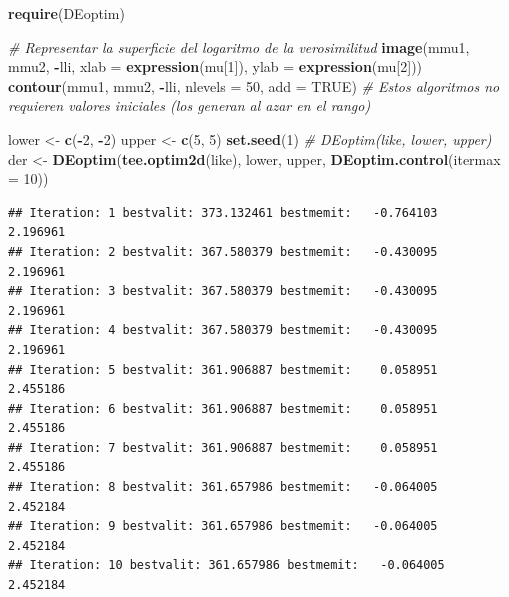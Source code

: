 \documentclass[]{book}
\newenvironment{Shaded}{\begin{snugshade}}{\end{snugshade}}
\newcommand{\KeywordTok}[1]{\textcolor[rgb]{0.13,0.29,0.53}{\textbf{#1}}}
\newcommand{\DataTypeTok}[1]{\textcolor[rgb]{0.13,0.29,0.53}{#1}}
\newcommand{\DecValTok}[1]{\textcolor[rgb]{0.00,0.00,0.81}{#1}}
\newcommand{\StringTok}[1]{\textcolor[rgb]{0.31,0.60,0.02}{#1}}
\newcommand{\CommentTok}[1]{\textcolor[rgb]{0.56,0.35,0.01}{\textit{#1}}}
\newcommand{\OtherTok}[1]{\textcolor[rgb]{0.56,0.35,0.01}{#1}}
\newcommand{\OperatorTok}[1]{\textcolor[rgb]{0.81,0.36,0.00}{\textbf{#1}}}
\newcommand{\NormalTok}[1]{#1}
\theoremstyle{definition}
\theoremstyle{definition}
\theoremstyle{definition}
\theoremstyle{remark}
\begin{document}
\begin{Shaded}
\begin{Highlighting}[]
\KeywordTok{require}\NormalTok{(DEoptim)}

\CommentTok{# Representar la superficie del logaritmo de la verosimilitud}
\KeywordTok{image}\NormalTok{(mmu1, mmu2, }\OperatorTok{-}\NormalTok{lli, }\DataTypeTok{xlab =} \KeywordTok{expression}\NormalTok{(mu[}\DecValTok{1}\NormalTok{]), }\DataTypeTok{ylab =} \KeywordTok{expression}\NormalTok{(mu[}\DecValTok{2}\NormalTok{]))}
\KeywordTok{contour}\NormalTok{(mmu1, mmu2, }\OperatorTok{-}\NormalTok{lli, }\DataTypeTok{nlevels =} \DecValTok{50}\NormalTok{, }\DataTypeTok{add =} \OtherTok{TRUE}\NormalTok{)}
\CommentTok{# Estos algoritmos no requieren valores iniciales (los generan al azar en el rango)}

\NormalTok{lower <-}\StringTok{ }\KeywordTok{c}\NormalTok{(}\OperatorTok{-}\DecValTok{2}\NormalTok{, }\OperatorTok{-}\DecValTok{2}\NormalTok{)}
\NormalTok{upper <-}\StringTok{ }\KeywordTok{c}\NormalTok{(}\DecValTok{5}\NormalTok{, }\DecValTok{5}\NormalTok{)}
\KeywordTok{set.seed}\NormalTok{(}\DecValTok{1}\NormalTok{)}
\CommentTok{# DEoptim(like, lower, upper)}
\NormalTok{der <-}\StringTok{ }\KeywordTok{DEoptim}\NormalTok{(}\KeywordTok{tee.optim2d}\NormalTok{(like), lower, upper, }\KeywordTok{DEoptim.control}\NormalTok{(}\DataTypeTok{itermax =} \DecValTok{10}\NormalTok{))}
\end{Highlighting}
\end{Shaded}

\begin{verbatim}
## Iteration: 1 bestvalit: 373.132461 bestmemit:   -0.764103    2.196961
## Iteration: 2 bestvalit: 367.580379 bestmemit:   -0.430095    2.196961
## Iteration: 3 bestvalit: 367.580379 bestmemit:   -0.430095    2.196961
## Iteration: 4 bestvalit: 367.580379 bestmemit:   -0.430095    2.196961
## Iteration: 5 bestvalit: 361.906887 bestmemit:    0.058951    2.455186
## Iteration: 6 bestvalit: 361.906887 bestmemit:    0.058951    2.455186
## Iteration: 7 bestvalit: 361.906887 bestmemit:    0.058951    2.455186
## Iteration: 8 bestvalit: 361.657986 bestmemit:   -0.064005    2.452184
## Iteration: 9 bestvalit: 361.657986 bestmemit:   -0.064005    2.452184
## Iteration: 10 bestvalit: 361.657986 bestmemit:   -0.064005    2.452184
\end{verbatim}

\begin{Shaded}
\end{Shaded}
\end{document}
